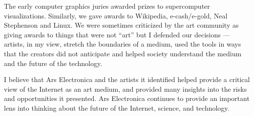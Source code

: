 The early computer graphics juries awarded prizes to supercomputer visualizations. Similarly, we gave awards to Wikipedia, e-cash/e-gold, Neal Stephenson and Linux. We were sometimes criticized by the art community as giving awards to things that were not ``art'' but I defended our decisions --- artists, in my view, stretch the boundaries of a medium, used the tools in ways that the creators did not anticipate and helped society understand the medium and the future of the technology.

I believe that Ars Electronica and the artists it identified helped provide a critical view of the Internet as an art medium, and provided many insights into the risks and opportunities it presented. Ars Electronica continues to provide an important lens into thinking about the future of the Internet, science, and technology.

